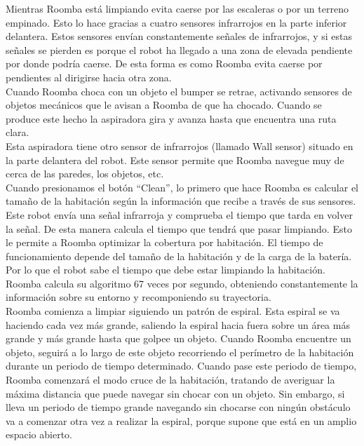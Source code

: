 Mientras Roomba está limpiando evita caerse por las escaleras o por un terreno empinado. Esto lo hace gracias a cuatro sensores infrarrojos en la parte inferior delantera. Estos sensores envían constantemente señales de infrarrojos, y si estas señales se pierden es porque el robot ha llegado a una zona de elevada pendiente por donde podría caerse. De esta forma es como Roomba evita caerse por pendientes al dirigirse hacia otra zona.\\

Cuando Roomba choca con un objeto el bumper se retrae, activando sensores de objetos mecánicos que le avisan a Roomba de que ha chocado. Cuando se produce este hecho la aspiradora gira y avanza hasta que encuentra una ruta clara.\\

Esta aspiradora tiene otro sensor de infrarrojos (llamado Wall sensor) situado en la parte delantera del robot. Este sensor permite que Roomba navegue muy de cerca de las paredes, los objetos, etc. \\

Cuando presionamos el botón ``Clean'', lo primero que hace Roomba es calcular el tamaño de la habitación según la información que recibe a través de sus sensores. Este robot envía una señal infrarroja y comprueba el tiempo que tarda en volver la señal. De esta manera calcula el tiempo que tendrá que pasar limpiando. Esto le permite a Roomba optimizar la cobertura por habitación. El tiempo de funcionamiento depende del tamaño de la habitación y de la carga de la batería. Por lo que el robot sabe el tiempo que debe estar limpiando la habitación.\\

Roomba calcula su algoritmo 67 veces por segundo, obteniendo constantemente la información sobre su entorno y recomponiendo su trayectoria.\\

Roomba comienza a limpiar siguiendo un patrón de espiral. Esta espiral se va haciendo cada vez más grande, saliendo la espiral hacia fuera sobre un área más grande y más grande hasta que golpee un objeto. Cuando Roomba encuentre un objeto, seguirá a lo largo de este objeto recorriendo el perímetro de la habitación durante un periodo de tiempo determinado. Cuando pase este periodo de tiempo, Roomba comenzará el modo cruce de la habitación, tratando de averiguar la máxima distancia que puede navegar sin chocar con un objeto. Sin embargo, si lleva un periodo de tiempo grande navegando sin chocarse con ningún obstáculo va a comenzar otra vez a realizar la espiral, porque supone que está en un amplio espacio abierto.\\

